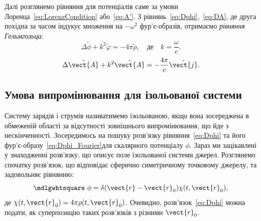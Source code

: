 Далі розглянемо рівняння для потенціалів саме за умови Лоренца~\eqref{eq:LorenzCondition} або~\eqref{eq:A'}. З рівнянь~\eqref{eq:Dphi},~\eqref{eq:DA},
де друга похідна за часом індукує множення на \( -\omega^2 \) фур’є-образів, отримаємо \emph{рівняння Гельмгольца}:
\begin{equation}\label{eq:Dphi_Fourier}
	\Delta \tilde{\phi} + k^2 \tilde{\varphi} = -4\pi \tilde{\rho}, \quad \text{де} \quad k = \frac{\omega}{c}.
\end{equation}
\begin{equation}\label{eq:DA_Fourier}
	\Delta \tilde{\vect{A}} + k^2 \tilde{\vect{A}} = -\frac{4\pi}{c} \tilde{\vect{j}}.
\end{equation}



\subsection*{Умова випромінювання для ізольованої системи}


Систему зарядів і струмів називатимемо ізольованою, якщо вона зосереджена в обмеженій області за відсутності зовнішнього випромінювання, що йде з
нескінченності. Зосередимось на пошуку розв’язку рівняння~\eqref{eq:Dphi} та його фур’є-образу~\eqref{eq:Dphi_Fourier}для скалярного потенціалу $\phi$.
Зараз ми зацікавлені у знаходженні розв’язку, що описує поле ізольованої системи джерел. Розглянемо спочатку розв’язок, що відповідає сферично
симетричному точковому джерелу, та задовольняє рівнянню:
\begin{equation*}
	\mdlgwhtsquare\ \phi = \delta(\vect{r} - \vect{r}_0)\chi(t, \vect{r}_0),
\end{equation*}
де $\chi(t, \vect{r}_0) = 4\pi\rho(t, \vect{r}_0)$. Очевидно, розв’язок~\eqref{eq:Dphi} можна подати, як суперпозицію
таких розв’язків з різними $\vect{r}_0$.

